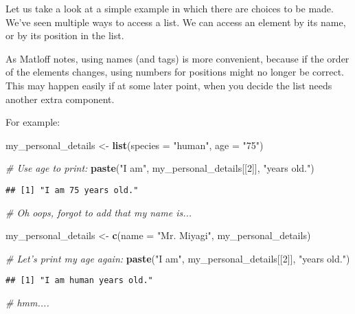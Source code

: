 \documentclass[]{article}
\newenvironment{Shaded}{\begin{snugshade}}{\end{snugshade}}
\newcommand{\CommentTok}[1]{\textcolor[rgb]{0.56,0.35,0.01}{\textit{#1}}}
\newcommand{\DataTypeTok}[1]{\textcolor[rgb]{0.13,0.29,0.53}{#1}}
\newcommand{\DecValTok}[1]{\textcolor[rgb]{0.00,0.00,0.81}{#1}}
\newcommand{\KeywordTok}[1]{\textcolor[rgb]{0.13,0.29,0.53}{\textbf{#1}}}
\newcommand{\NormalTok}[1]{#1}
\newcommand{\StringTok}[1]{\textcolor[rgb]{0.31,0.60,0.02}{#1}}
\begin{document}
Let us take a look at a simple example in which there are choices to be
made. We've seen multiple ways to access a list. We can access an
element by its name, or by its position in the list.

As Matloff notes, using names (and tags) is more convenient, because if
the order of the elements changes, using numbers for positions might no
longer be correct. This may happen easily if at some later point, when
you decide the list needs another extra component.

For example:

\begin{Shaded}
\begin{Highlighting}[]
\NormalTok{my_personal_details <-}\StringTok{ }\KeywordTok{list}\NormalTok{(}\DataTypeTok{species =} \StringTok{"human"}\NormalTok{, }\DataTypeTok{age =} \StringTok{"75"}\NormalTok{)}

\CommentTok{# Use age to print:}
\KeywordTok{paste}\NormalTok{(}\StringTok{"I am"}\NormalTok{, my_personal_details[[}\DecValTok{2}\NormalTok{]], }\StringTok{"years old."}\NormalTok{)}
\end{Highlighting}
\end{Shaded}

\begin{verbatim}
## [1] "I am 75 years old."
\end{verbatim}

\begin{Shaded}
\begin{Highlighting}[]
\CommentTok{# Oh oops, forgot to add that my name is...}

\NormalTok{my_personal_details <-}\StringTok{ }\KeywordTok{c}\NormalTok{(}\DataTypeTok{name =} \StringTok{"Mr. Miyagi"}\NormalTok{, my_personal_details)}

\CommentTok{# Let's print my age again:}
\KeywordTok{paste}\NormalTok{(}\StringTok{"I am"}\NormalTok{, my_personal_details[[}\DecValTok{2}\NormalTok{]], }\StringTok{"years old."}\NormalTok{)}
\end{Highlighting}
\end{Shaded}

\begin{verbatim}
## [1] "I am human years old."
\end{verbatim}

\begin{Shaded}
\begin{Highlighting}[]
\CommentTok{# hmm....}
\end{Highlighting}
\end{Shaded}
\end{document}
